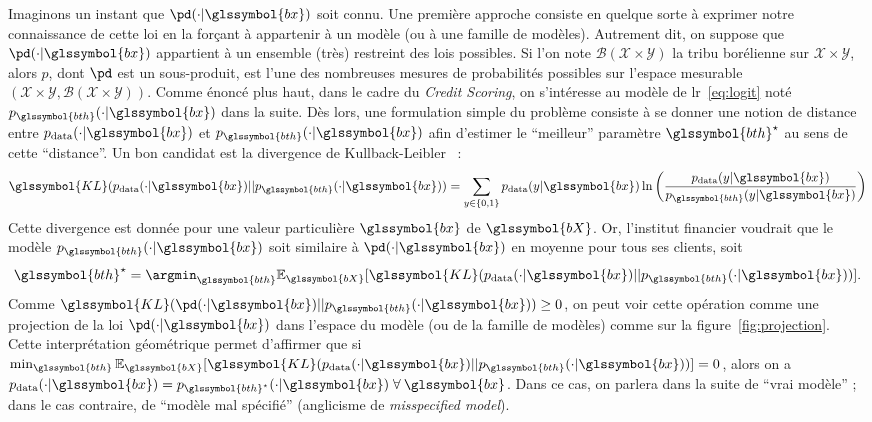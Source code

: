 Imaginons un instant que $\pd(\cdot | \glssymbol{bx})$ soit connu. Une première approche consiste en quelque sorte à exprimer notre connaissance de cette loi en la forçant à appartenir à un modèle (ou à une famille de modèles). Autrement dit, on suppose que $\pd(\cdot | \glssymbol{bx})$ appartient à un ensemble (très) restreint des lois possibles. Si l'on note $\mathcal{B}(\mathcal{X} \times \mathcal{Y})$ la tribu borélienne sur $\mathcal{X} \times \mathcal{Y}$, alors $p$, dont $\pd$ est un sous-produit, est l'une des nombreuses mesures de probabilités possibles sur l'espace mesurable $(\mathcal{X} \times \mathcal{Y},\mathcal{B}(\mathcal{X} \times \mathcal{Y}))$. Comme énoncé plus haut, dans le cadre du \textit{Credit Scoring}, on s'intéresse au modèle de \gls{lr}~\eqref{eq:logit} noté $p_{\glssymbol{bth}}(\cdot | \glssymbol{bx})$ dans la suite. Dès lors, une formulation simple du problème consiste à se donner une notion de distance entre $p_{\text{data}}(\cdot | \glssymbol{bx})$ et $p_{\glssymbol{bth}}(\cdot | \glssymbol{bx})$ afin d'estimer le ``meilleur'' paramètre $\glssymbol{bth}^\star$ au sens de cette ``distance''. Un bon candidat est la divergence de Kullback-Leibler~\cite{kullback1951information} :
\begin{equation} \label{eq:KL}
\glssymbol{KL}(p_{\text{data}}(\cdot | \glssymbol{bx})||p_{\glssymbol{bth}}(\cdot | \glssymbol{bx})) = \sum_{y \in \{0,1\}} p_{\text{data}}(y | \glssymbol{bx}) \ln \left( \frac{p_{\text{data}}(y | \glssymbol{bx})}{p_{\glssymbol{bth}}(y | \glssymbol{bx})} \right)
\end{equation}
Cette divergence est donnée pour une valeur particulière $\glssymbol{bx}$ de $\glssymbol{bX}$. Or, l'institut financier voudrait que le modèle $p_{\glssymbol{bth}}(\cdot | \glssymbol{bx})$ soit similaire à $\pd(\cdot | \glssymbol{bx})$ en moyenne pour tous ses clients, soit $${\glssymbol{bth}}^\star = \argmin_{\glssymbol{bth}} \mathbb{E}_{\glssymbol{bX}} [\glssymbol{KL}(p_{\text{data}}(\cdot | \glssymbol{bx})||p_{\glssymbol{bth}}(\cdot | \glssymbol{bx}))].$$ Comme $\glssymbol{KL}(\pd(\cdot | \glssymbol{bx})||p_{\glssymbol{bth}}(\cdot | \glssymbol{bx})) \geq 0$, on peut voir cette opération comme une projection de la loi $\pd(\cdot | \glssymbol{bx})$ dans l'espace du modèle (ou de la famille de modèles) comme sur la figure~\ref{fig:projection}. Cette interprétation géométrique permet d'affirmer que si $\min_{\glssymbol{bth}} \mathbb{E}_{\glssymbol{bX}} [\glssymbol{KL}(p_{\text{data}}(\cdot | \glssymbol{bx})||p_{\glssymbol{bth}}(\cdot | \glssymbol{bx}))] = 0$, alors on a $p_{\text{data}}(\cdot | \glssymbol{bx}) = p_{\glssymbol{bth}^\star}(\cdot | \glssymbol{bx}) \; \forall \: \glssymbol{bx}$. Dans ce cas, on parlera dans la suite de ``vrai modèle'' ; dans le cas contraire, de ``modèle mal spécifié'' (anglicisme de \textit{misspecified model}).

